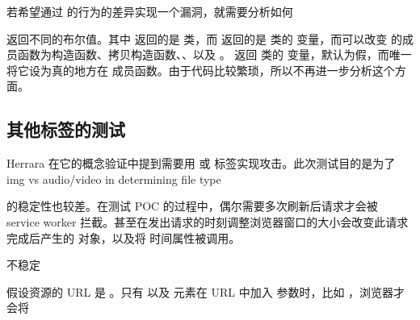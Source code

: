 若希望通过  的行为的差异实现一个漏洞，就需要分析如何

\noindent{} 返回不同的布尔值。其中  返回的是  类，而  返回的是  类的  变量，而可以改变  的成员函数为构造函数、拷贝构造函数、、以及 。 返回  类的  变量，默认为假，而唯一将它设为真的地方在  成员函数。由于代码比较繁琐，所以不再进一步分析这个方面。

\subsection{其他标签的测试}

Herrara 在它的概念验证中提到需要用  或  标签实现攻击。此次测试目的是为了
img vs audio/video in determining file type



 的稳定性也较差。在测试 POC 的过程中，偶尔需要多次刷新后请求才会被 service worker 拦截。甚至在发出请求的时刻调整浏览器窗口的大小会改变此请求完成后产生的  对象，以及将  时间属性被调用。


不稳定
    
    
    假设资源的 URL 是 。只有  以及  元素在 URL 中加入  参数时，比如 ，浏览器才会将